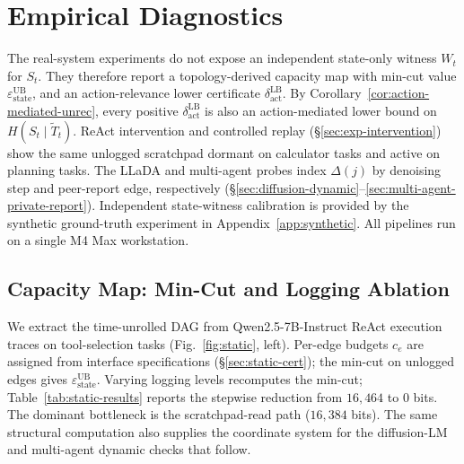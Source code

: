   \section{Empirical Diagnostics}
  \label{sec:empirical}

  The real-system experiments do not expose an independent state-only witness
  $W_t$ for $S_t$. They therefore report a topology-derived capacity map with
  min-cut value $\varepsilon_\text{state}^\text{UB}$, and an action-relevance
  lower certificate $\delta_\text{act}^\text{LB}$. By
  Corollary~\ref{cor:action-mediated-unrec}, every positive
  $\delta_\text{act}^\text{LB}$ is also an action-mediated lower bound on
  $H(S_t\mid\tilde T_t)$. ReAct intervention and controlled replay
  (\S\ref{sec:exp-intervention}) show the same unlogged scratchpad dormant on
  calculator tasks and active on planning tasks. The LLaDA and multi-agent
  probes index $\Delta(j)$ by denoising step and peer-report edge, respectively
  (\S\ref{sec:diffusion-dynamic}--\ref{sec:multi-agent-private-report}).
  Independent state-witness calibration is provided by the synthetic
  ground-truth experiment in Appendix~\ref{app:synthetic}. All pipelines run on
  a single M4 Max workstation.

  \subsection{Capacity Map: Min-Cut and Logging Ablation}
  \label{sec:exp-static} 

  We extract the time-unrolled DAG from Qwen2.5-7B-Instruct ReAct execution
  traces on tool-selection tasks (Fig.~\ref{fig:static}, left). Per-edge budgets
   $c_e$ are assigned from interface specifications (\S\ref{sec:static-cert});
  the min-cut on unlogged edges gives $\varepsilon_\text{state}^\text{UB}$.
  Varying logging levels recomputes the min-cut; Table~\ref{tab:static-results}
  reports the stepwise reduction from $16{,}464$ to $0$ bits. The dominant
  bottleneck is the scratchpad-read path ($16{,}384$ bits). The same structural
  computation also supplies the coordinate system for the diffusion-LM and
  multi-agent dynamic checks that follow.

